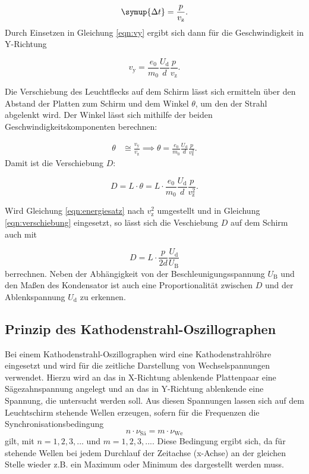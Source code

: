 \begin{equation}
\symup{\Delta{t}} = \frac{p}{v_{\text{z}}}.
\end{equation}
Durch Einsetzen in Gleichung \ref{eqn:vy} ergibt sich dann für die Geschwindigkeit in Y-Richtung 

\begin{equation}
v_{\text{y}} = \frac{e_0}{m_0} \frac{U_{\text{d}}}{d} \frac{p}{v_{\text{z}}}.
\end{equation}

Die Verschiebung des Leuchtflecks auf dem Schirm lässt sich ermitteln über den Abstand der Platten zum Schirm und dem Winkel $\theta$, um den der Strahl abgelenkt wird.
Der Winkel lässt sich mithilfe der beiden Geschwindigkeitskomponenten berechnen:

\begin{equation}
\begin{aligned}
\theta &\cong \frac{v_{\text{y}}}{v_{\text{z}}}
\implies \theta = \frac{e_0}{m_0} \frac{U_{\text{d}}}{d} \frac{p}{v_{\text{z}}^2}.
\end{aligned}
\end{equation}
Damit ist die Verschiebung $D$:

\begin{equation}
D = L \cdot \theta = L \cdot \frac{e_0}{m_0} \frac{U_{\text{d}}}{d} \frac{p}{v_{\text{z}}^2}.
\label{eqn:verschiebung}
\end{equation}

Wird Gleichung \ref{eqn:energiesatz} nach $v_{\text{z}}^2$ umgestellt und in Gleichung \ref{eqn:verschiebung} eingesetzt, so lässt sich die Veschiebung $D$ auf dem Schirm auch mit

\begin{equation}
D = L \cdot \frac{p}{2d} \frac{U_{\text{d}}}{U_{\text{B}}}
\end{equation}
berrechnen. Neben der Abhängigkeit von der Beschleunigungsspannung $U_{\text{B}}$ und den Maßen des Kondensator ist auch eine Proportionalität zwischen $D$ und der Ablenkspannung $U_{\text{d}}$ zu erkennen. 




\subsection{Prinzip des Kathodenstrahl-Oszillographen}
Bei einem Kathodenstrahl-Oszillographen wird eine Kathodenstrahlröhre eingesetzt und wird für die zeitliche Darstellung von Wechselspannungen verwendet. Hierzu wird an das in X-Richtung ablenkende Plattenpaar 
eine Sägezahnspannung angelegt und an das in Y-Richtung ablenkende eine Spannung, die untersucht werden soll. Aus diesen Spannungen lassen sich auf dem Leuchtschirm stehende Wellen erzeugen, sofern für die 
Frequenzen die Synchronisationsbedingung
\begin{equation}
n\cdot \nu_{\text{Sä}} = m \cdot \nu_{\text{We}}
\end{equation}
gilt, mit $n = 1,2,3,...$ und $m = 1,2,3,...$.
Diese Bedingung ergibt sich, da für stehende Wellen bei jedem Durchlauf der Zeitachse (x-Achse) an der gleichen Stelle wieder z.B. ein Maximum oder Minimum des dargestellt werden muss.\\